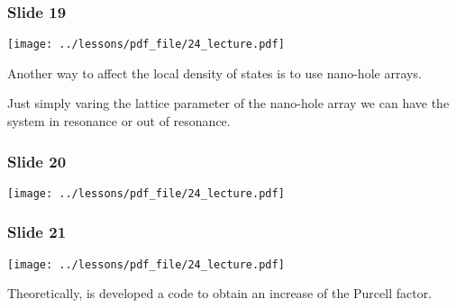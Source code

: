\documentclass[../main/main.tex]{subfiles}
\begin{document}
\subsubsection*{Slide 19}

\begin{minipage}[]{0.5\linewidth}
\centering
\texttt{[image: ../lessons/pdf\_file/24\_lecture.pdf]}
\end{minipage}
\hspace{0.3cm}\vspace{0.3cm}
\begin{minipage}[c]{0.47\linewidth}

Another way to affect the local density of states is to use nano-hole arrays.

Just simply varing the lattice parameter of the nano-hole array we can have the system in resonance or out of resonance.

\end{minipage}

\subsubsection*{Slide 20}

\begin{minipage}[]{0.5\linewidth}
\centering
\texttt{[image: ../lessons/pdf\_file/24\_lecture.pdf]}
\end{minipage}
\hspace{0.3cm}\vspace{0.3cm}
\begin{minipage}[c]{0.47\linewidth}

\end{minipage}

\subsubsection*{Slide 21}

\begin{minipage}[]{0.5\linewidth}
\centering
\texttt{[image: ../lessons/pdf\_file/24\_lecture.pdf]}
\end{minipage}
\hspace{0.3cm}\vspace{0.3cm}
\begin{minipage}[c]{0.47\linewidth}

Theoretically, is developed a code to obtain an increase of the Purcell factor.

\end{minipage}
\end{document}
